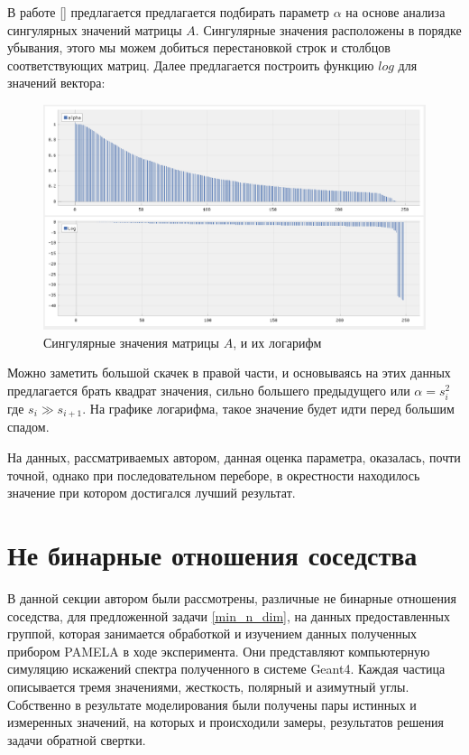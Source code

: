 \documentclass[a4paper,12pt]{diplom}
\begin{document}
В работе [] предлагается предлагается подбирать параметр $\alpha$ на основе анализа сингулярных значений матрицы $A$. Сингулярные значения 
расположены в порядке убывания, этого мы можем добиться перестановкой строк и столбцов соответствующих матриц. Далее предлагается построить 
функцию $log$ для значений вектора:

\begin{figure}[h]
   \includegraphics[width=\linewidth]{images/alpha.png}
   \caption{ Сингулярные значения матрицы $A$, и их логарифм }
   \label{photo:alpha}
\end{figure}

Можно заметить большой скачек в правой части, и основываясь на этих данных предлагается брать квадрат значения, сильно большего предыдущего или
$\alpha = s^2_{i}$ где $ s_{i} \gg s_{i+1} $. 
На графике логарифма, такое значение будет идти перед большим спадом.

На данных, рассматриваемых автором, данная оценка параметра, оказалась, почти точной, однако при последовательном переборе, в окрестности 
находилось значение при котором достигался лучший результат.

\section{Не бинарные отношения соседства}

В данной секции автором были рассмотрены, различные не бинарные отношения соседства, для предложенной задачи \eqref{min_n_dim}, на данных 
предоставленных группой, которая занимается обработкой и изучением данных полученных прибором PAMELA в ходе эксперимента. Они представляют 
компьютерную симуляцию искажений спектра полученного в системе Geant4. Каждая частица описывается тремя значениями, жесткость, полярный и 
азимутный углы. Собственно в результате моделирования были получены пары истинных и измеренных значений, на которых и происходили замеры, 
результатов решения задачи обратной свертки.
\end{document}

